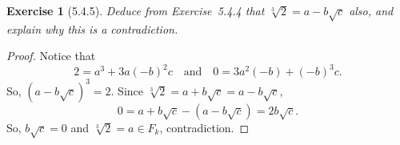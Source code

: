 \documentclass[12pt]{article}
\theoremstyle{plain}
\newtheorem{ex}{Exercise}
\begin{document}
\begin{ex} [5.4.5]
  Deduce from Exercise~5.4.4 that $\sqrt[3]{2}=a-b\sqrt{c}$ also, and explain why this is a contradiction.
\end{ex}

\begin{proof}
  Notice that
  \[
    2=a^3+3a(-b)^2c\quad\text{and}\quad0=3a^2(-b)+(-b)^3c.
  \]
  So, $(a-b\sqrt{c})^3=2$. Since $\sqrt[3]{2}=a+b\sqrt{c}=a-b\sqrt{c}$,
  \[
    0=a+b\sqrt{c}-(a-b\sqrt{c})=2b\sqrt{c}.
  \]
  So, $b\sqrt{c}=0$ and $\sqrt[3]{2}=a\in F_k$, contradiction.
\end{proof}
\end{document}
